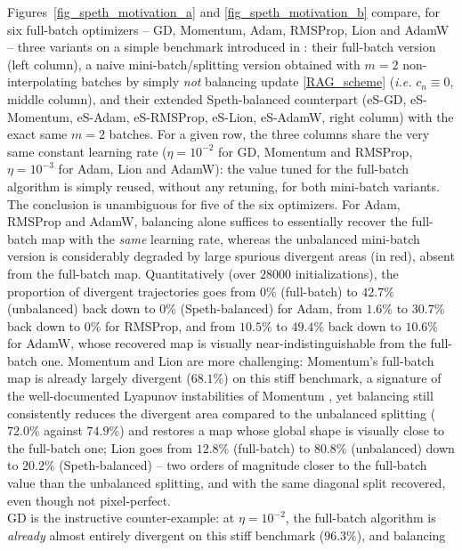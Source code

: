 Figures~\ref{fig_speth_motivation_a} and \ref{fig_speth_motivation_b} compare, for six full-batch optimizers -- GD, Momentum, Adam, RMSProp, Lion and AdamW
-- three variants on a simple benchmark introduced in \cite{Lyap_Theory_Bilel,Bilel_thesis}: their full-batch version (left column), a naive mini-batch/splitting version obtained with $m=2$ non-interpolating batches by simply {\em not} balancing update \eqref{RAG_scheme} (\emph{i.e.} $c_n\equiv 0$, middle column), and their extended Speth-balanced counterpart (eS-GD, eS-Momentum, eS-Adam, eS-RMSProp, eS-Lion, eS-AdamW, right column) with the exact same $m=2$ batches. For a given row, the three columns share the very same constant learning rate ($\eta=10^{-2}$ for GD, Momentum and RMSProp, $\eta=10^{-3}$ for Adam, Lion and AdamW): the value tuned for the full-batch algorithm is simply reused, without any retuning, for both mini-batch variants. \\
The conclusion is unambiguous for five of the six optimizers. For Adam, RMSProp and AdamW, balancing alone suffices to essentially recover the full-batch map with the {\em same} learning rate, whereas the unbalanced mini-batch version is considerably degraded by large spurious divergent areas (in red), absent from the full-batch map. Quantitatively (over $28000$ initializations), the proportion of divergent trajectories goes from $0\%$ (full-batch) to $42.7\%$ (unbalanced) back down to $0\%$ (Speth-balanced) for Adam, from $1.6\%$ to $30.7\%$ back down to $0\%$ for RMSProp, and from $10.5\%$ to $49.4\%$ back down to $10.6\%$ for AdamW, whose recovered map is visually near-indistinguishable from the full-batch one. Momentum and Lion are more challenging: Momentum's full-batch map is already largely divergent ($68.1\%$) on this stiff benchmark, a signature of the well-documented Lyapunov instabilities of Momentum \cite{Bilel,Bilel_thesis}, yet balancing still consistently reduces the divergent area compared to the unbalanced splitting ($72.0\%$ against $74.9\%$) and restores a map whose global shape is visually close to the full-batch one; Lion goes from $12.8\%$ (full-batch) to $80.8\%$ (unbalanced) down to $20.2\%$ (Speth-balanced) -- two orders of magnitude closer to the full-batch value than the unbalanced splitting, and with the same diagonal split recovered, even though not pixel-perfect. \\
GD is the instructive counter-example: at $\eta=10^{-2}$, the full-batch algorithm is {\em already} almost entirely divergent on this stiff benchmark ($96.3\%$), and balancing
